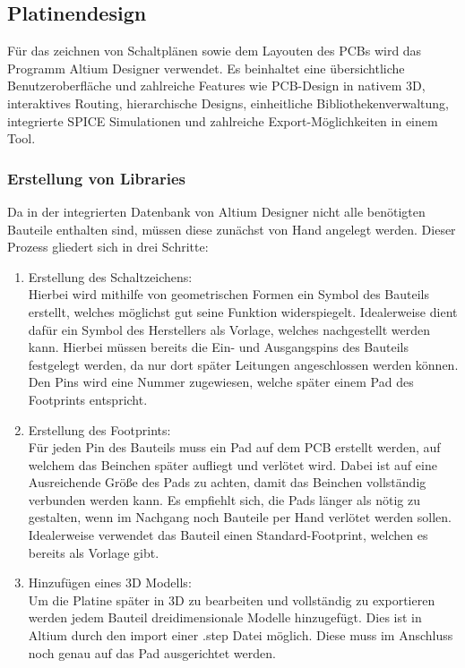 

\subsection{Platinendesign}

Für das zeichnen von Schaltplänen sowie dem Layouten des PCBs wird das Programm Altium Designer verwendet. Es beinhaltet eine übersichtliche Benutzeroberfläche und zahlreiche Features wie PCB-Design in nativem 3D, interaktives Routing, hierarchische Designs, einheitliche Bibliothekenverwaltung, integrierte SPICE Simulationen und zahlreiche Export-Möglichkeiten in einem Tool. 


\subsubsection{Erstellung von Libraries}
Da in der integrierten Datenbank von Altium Designer nicht alle benötigten Bauteile enthalten sind, müssen diese zunächst von Hand angelegt werden. Dieser Prozess gliedert sich in drei Schritte:

\begin{enumerate}
\item Erstellung des Schaltzeichens:\\
Hierbei wird mithilfe von geometrischen Formen ein Symbol des Bauteils erstellt, welches möglichst gut seine Funktion widerspiegelt. Idealerweise dient dafür ein Symbol des Herstellers als Vorlage, welches nachgestellt werden kann. Hierbei müssen bereits die Ein- und Ausgangspins des Bauteils festgelegt werden, da nur dort später Leitungen angeschlossen werden können. Den Pins wird eine Nummer zugewiesen, welche später einem Pad des Footprints entspricht.

\item Erstellung des Footprints: \\
Für jeden Pin des Bauteils muss ein Pad auf dem PCB erstellt werden, auf welchem das Beinchen später aufliegt und verlötet wird. Dabei ist auf eine Ausreichende Größe des Pads zu achten, damit das Beinchen vollständig verbunden werden kann. Es empfiehlt sich, die Pads länger als nötig zu gestalten, wenn im Nachgang noch Bauteile per Hand verlötet werden sollen. Idealerweise verwendet das Bauteil einen Standard-Footprint, welchen es bereits als Vorlage gibt. 

\item Hinzufügen eines 3D Modells: \\
Um die Platine später in 3D zu bearbeiten und vollständig zu exportieren werden jedem Bauteil dreidimensionale Modelle hinzugefügt. Dies ist in Altium durch den import einer .step Datei möglich. Diese muss im Anschluss noch genau auf das Pad ausgerichtet werden.
\end{enumerate}

